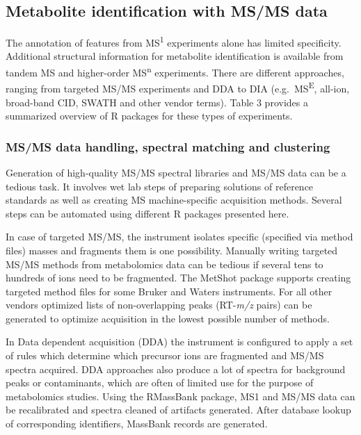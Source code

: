\documentclass[]{article}
\begin{document}
\newpage

\hypertarget{metabolite-identification-with-msms-data}{%
\subsection{Metabolite identification with MS/MS data}\label{metabolite-identification-with-msms-data}}

The annotation of features from MS\textsuperscript{1} experiments alone has limited specificity. Additional structural information for metabolite identification is available from tandem MS and higher-order MS\textsuperscript{n} experiments. There are different approaches, ranging from targeted MS/MS experiments and DDA to DIA (e.g.~MS\textsuperscript{E}, all-ion, broad-band CID, SWATH and other vendor terms). Table 3 provides a summarized overview of R packages for these types of experiments.

\hypertarget{msms-data-handling-spectral-matching-and-clustering}{%
\subsubsection{MS/MS data handling, spectral matching and clustering}\label{msms-data-handling-spectral-matching-and-clustering}}

Generation of high-quality MS/MS spectral libraries and MS/MS data can be a tedious task. It involves wet lab steps of preparing solutions of reference standards as well as creating MS machine-specific acquisition methods. Several steps can be automated using different R packages presented here.

In case of targeted MS/MS, the instrument isolates specific (specified via method files) masses and fragments them is one possibility. Manually writing targeted MS/MS methods from metabolomics data can be tedious if several tens to hundreds of ions need to be fragmented. The MetShot package supports creating targeted method files for some Bruker and Waters instruments. For all other vendors optimized lists of non-overlapping peaks (RT-\emph{m/z} pairs) can be generated to optimize acquisition in the lowest possible number of methods.

In Data dependent acquisition (DDA) the instrument is configured to apply a set of rules which determine which precursor ions are fragmented and MS/MS spectra acquired. DDA approaches also produce a lot of spectra for background peaks or contaminants, which are often of limited use for the purpose of metabolomics studies. Using the RMassBank package, MS1 and MS/MS data can be recalibrated and spectra cleaned of artifacts generated. After database lookup of corresponding identifiers, MassBank records are generated.
\end{document}
